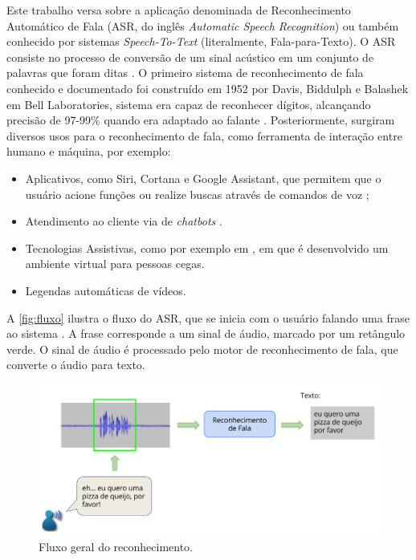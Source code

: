 Este trabalho versa sobre a aplicação denominada de  Reconhecimento Automático de Fala (ASR, do inglês \textit{Automatic Speech Recognition}) ou também conhecido por sistemas \textit{Speech-To-Text} (literalmente, Fala-para-Texto). O ASR  consiste no processo de conversão de um sinal acústico em um conjunto de palavras que foram ditas  \cite{voiceinteraction}. O primeiro sistema de reconhecimento de fala conhecido e documentado foi construído em 1952 por Davis, Biddulph e Balashek em Bell Laboratories, sistema era capaz de reconhecer dígitos, alcançando precisão de 97-99\% quando era adaptado ao falante \cite{juang2005automatic} \cite{pieraccini2012audrey}. Posteriormente, surgiram diversos usos para o reconhecimento de fala, como ferramenta de interação entre humano e máquina, por exemplo:

    \begin{itemize}
        \item Aplicativos, como Siri, Cortana e Google Assistant, que permitem que o usuário acione funções ou realize buscas através de comandos de voz \cite{lopez2017alexa};
        \item Atendimento ao cliente via de \textit{chatbots} \cite{raju2018contextual}.
        \item Tecnologias Assistivas, como por exemplo em , em que é desenvolvido um ambiente virtual para pessoas cegas.
        \item Legendas automáticas de vídeos.
        \end{itemize}


A \autoref{fig:fluxo} ilustra o fluxo do ASR, que se inicia com o usuário falando uma frase ao sistema \cite{cpqd}. A frase corresponde a um sinal de áudio, marcado por um retângulo verde. O sinal de áudio é processado pelo motor de reconhecimento de fala, que converte o áudio para texto. 

\begin{figure}[h!]
\centering
\caption{Fluxo geral do reconhecimento.}
\label{fig:fluxo}
\includegraphics[width=\textwidth]{images/asr-flow.png}
\end{figure}


